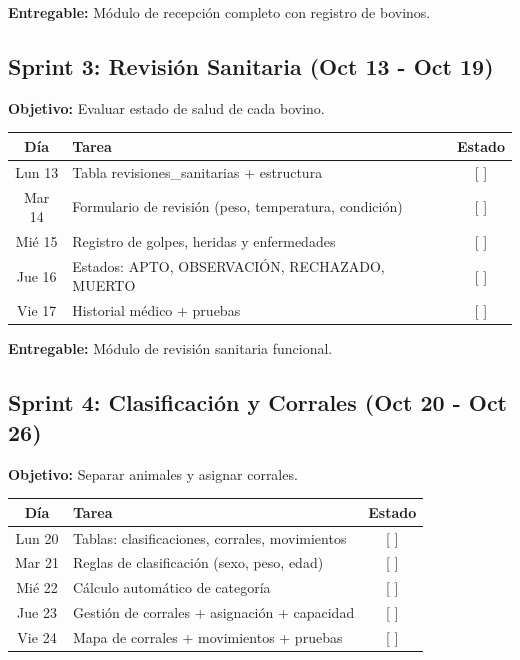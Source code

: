 \documentclass[11pt,a4paper]{article}
\begin{document}
\textbf{Entregable:} Módulo de recepción completo con registro de bovinos.

\vspace{0.5cm}

\subsection*{Sprint 3: Revisión Sanitaria (Oct 13 - Oct 19)}

\textbf{Objetivo:} Evaluar estado de salud de cada bovino.

\begin{center}
\begin{tabularx}{\textwidth}{|c|X|c|}
\hline
\rowcolor{verdeclaro}
\textbf{Día} & \textbf{Tarea} & \textbf{Estado} \\
\hline
Lun 13 & Tabla revisiones\_sanitarias + estructura & [ ] \\
\hline
Mar 14 & Formulario de revisión (peso, temperatura, condición) & [ ] \\
\hline
Mié 15 & Registro de golpes, heridas y enfermedades & [ ] \\
\hline
Jue 16 & Estados: APTO, OBSERVACIÓN, RECHAZADO, MUERTO & [ ] \\
\hline
Vie 17 & Historial médico + pruebas & [ ] \\
\hline
\end{tabularx}
\end{center}

\textbf{Entregable:} Módulo de revisión sanitaria funcional.

\vspace{0.5cm}

\subsection*{Sprint 4: Clasificación y Corrales (Oct 20 - Oct 26)}

\textbf{Objetivo:} Separar animales y asignar corrales.

\begin{center}
\begin{tabularx}{\textwidth}{|c|X|c|}
\hline
\rowcolor{verdeclaro}
\textbf{Día} & \textbf{Tarea} & \textbf{Estado} \\
\hline
Lun 20 & Tablas: clasificaciones, corrales, movimientos & [ ] \\
\hline
Mar 21 & Reglas de clasificación (sexo, peso, edad) & [ ] \\
\hline
Mié 22 & Cálculo automático de categoría & [ ] \\
\hline
Jue 23 & Gestión de corrales + asignación + capacidad & [ ] \\
\hline
Vie 24 & Mapa de corrales + movimientos + pruebas & [ ] \\
\hline
\end{tabularx}
\end{center}
\end{document}
